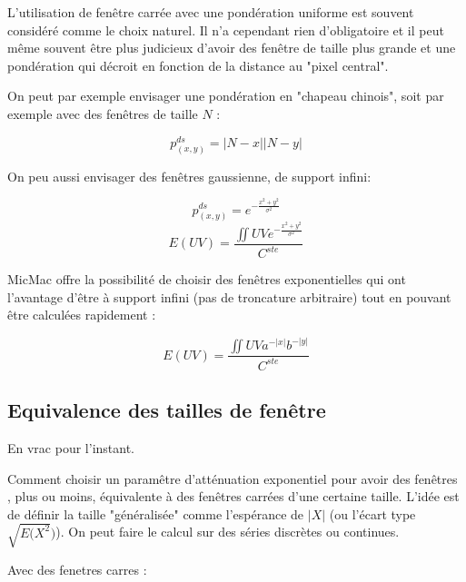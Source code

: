 \label{MecaGen:FEN:EXPO}

L'utilisation de fen\^etre carr\'ee avec une pond\'eration uniforme
est souvent consid\'er\'e comme le choix naturel. Il n'a cependant
rien d'obligatoire et il peut m\^eme souvent \^etre plus judicieux
d'avoir des fen\^etre de taille plus grande et une pond\'eration
qui d\'ecroit en fonction de la distance au "pixel central".

On peut par exemple envisager une pond\'eration en "chapeau chinois",
soit par exemple avec des fen\^etres de taille $N$ :

\begin{equation}
   p^{ds}_{(x,y)} = |N-x||N-y|
\end{equation}

On peu aussi envisager des fen\^etres gaussienne, de support 
infini:

\begin{equation}
   p^{ds}_{(x,y)} = e^{-\frac{x^2+y^2}{\sigma ^2}}
\end{equation}
\begin{equation}
    E(UV) =\frac{\iint  UV e^{-\frac{x^2+y^2}{\sigma ^2}}}{C^{ste}}
\end{equation}

MicMac offre la possibilit\'e de choisir des fen\^etres exponentielles
qui ont l'avantage d'\^etre \`a support infini (pas de troncature
arbitraire) tout en pouvant \^etre  calcul\'ees rapidement :

\begin{equation}
    E(UV) =\frac{\iint  UV a^{-|x|} b^{-|y|}}{C^{ste}}
\end{equation}


\subsection{Equivalence des tailles de fen\^etre}

En vrac pour l'instant. 

Comment choisir un param\^etre d'att\'enuation exponentiel pour avoir des
fen\^etres , plus ou moins, \'equivalente \`a des fen\^etres carr\'ees d'une
certaine taille.
L'id\'ee est de d\'efinir la taille "g\'en\'eralis\'ee"
comme l'esp\'erance de $|X|$ (ou l'\'ecart type $\sqrt{E(X^2})$).
On peut faire le calcul sur des s\'eries discr\`etes ou continues.

Avec des fenetres carres :

